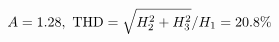 \documentclass[preview]{standalone}
\begin{document}
\begin{align*}
\special{dvisvgm:raw <g id='unique000'>}A=1.28,\ \text{THD}=\sqrt{H_2^2+H_3^2}/H_1=20.8\%\special{dvisvgm:raw </g>}
\end{align*}
\end{document}
